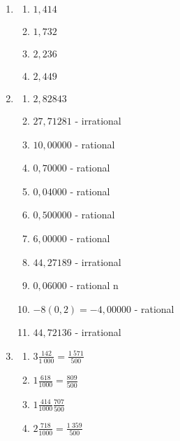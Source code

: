 \begin{eocsolutions}{}
{\begin{enumerate}[itemsep=6pt, label=\textbf{\arabic*}. ]
\item %
\begin{multicols}{2}
    \begin{enumerate}[noitemsep, label=\textbf{(\alph*)} ] 
    \item $1,414$ %
    \item $1,732$%
    \item $2,236$%
    \item $2,449$%
    \end{enumerate}
\end{multicols}
% 
\item %
\begin{multicols}{2}
    \begin{enumerate}[noitemsep, label=\textbf{(\alph*)} ] 
    \item $2,82843$%
    \item $27,71281$ - irrational %
    \item $10,00000$ - rational 
    \item $0,70000$ - rational  %
    \item $0,04000$ - rational %
    \item $0,500000$ - rational  %
    \item $6,00000$ - rational  %
    \item $44,27189$ - irrational  %
    \item $0,06000$ - rational n %
    \item $-8(0,2) = -4,00000$ - rational  %
    \item $44,72136$ - irrational %
    \end{enumerate}
\end{multicols}
\item %
\begin{multicols}{2}
\begin{enumerate}[noitemsep, label=\textbf{(\alph*)} ] 
\item $3 \frac{142}{1~000} =\frac{1~571}{500}$
\item $1\frac{618}{1000}=\frac{809}{500}$
\item $1\frac{414}{1000}\frac{707}{500}$
\item $2\frac{718}{1000}=\frac{1~359}{500}$
    \end{enumerate}
\end{multicols}


\end{enumerate}}
\end{eocsolutions}
